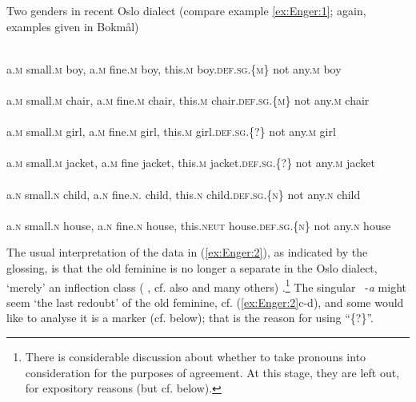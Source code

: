 \documentclass[output=paper]{langsci/langscibook}
\begin{document}
\ea\label{ex:Enger:2} Two genders in recent Oslo dialect (compare example \ref{ex:Enger:1}; again,
examples given in Bokmål)

\ea\label{ex:Enger:2a}
\\
a.\textsc{m} small.\textsc{m} boy, a.\textsc{m} fine.\textsc{m} boy, this.\textsc{m} boy.\textsc{def}.\textsc{sg}.\textsc{\{m\}} not any.\textsc{m} boy\\

\ex\label{ex:Enger:2b}
\\
a.\textsc{m} small.\textsc{m} chair, a.\textsc{m} fine.\textsc{m} chair, this.\textsc{m} chair.\textsc{def}.\textsc{sg}.\textsc{\{m\}} not any.\textsc{m}
chair\\

\ex\label{ex:Enger:2c}
\\
a.\textsc{m} small.\textsc{m} girl, a.\textsc{m} fine.\textsc{m} girl, this.\textsc{m} girl.\textsc{def.sg.{\{}?{\}}} not any.\textsc{m}
girl\\

\ex\label{ex:Enger:2d}
\\
a.\textsc{m} small.\textsc{m} jacket, a.\textsc{m} fine jacket, this.\textsc{m} jacket.\textsc{def}.\textsc{sg}.\textsc{{\{}?{\}}} not
any.\textsc{m} jacket\\

\ex\label{ex:Enger:2e}
\\
a.\textsc{n} small.\textsc{n} child, a.\textsc{n} fine.\textsc{n}. child, this.\textsc{n}
child.\textsc{def}.\textsc{sg}.\textsc{\{n\}} not any.\textsc{n} child\\

\ex\label{ex:Enger:2f}
\\
a.\textsc{n} small.\textsc{n} house, a.\textsc{n} fine.\textsc{n} house, this.\textsc{neut}
house.\textsc{def}.\textsc{sg}.\textsc{\{n\}} not any.\textsc{n} house\\

\z
\z

The usual interpretation of the data in (\ref{ex:Enger:2}), as indicated by the
glossing, is that the old feminine is no longer a separate  in the
Oslo dialect, `merely' an inflection class %
(%
\citealt{Lodrup11}, cf. also \citealt{Enger2004a,Enger2004b} and many others)%
%
.\footnote{There is considerable discussion
  about whether to take pronouns into consideration for the purposes of
   agreement. At this stage, they are left out, for expository
  reasons (but cf.  below).} The  singular~ -\emph{a}
might seem `the last redoubt' of the old feminine, cf. (\ref{ex:Enger:2}c-d), and some
would like to analyse it is a  marker (cf.  below); that is
the reason for using ``\{?\}''.
\end{document}
